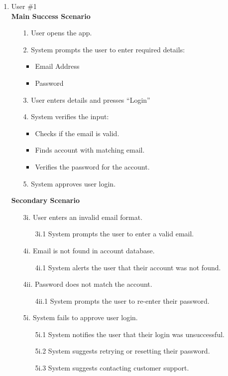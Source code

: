 \documentclass{article}
\begin{document}
\begin{enumerate}[{\bf BE1.}]
{\begin{enumerate}[{\bf VP1.}]
    \item User \#1 \\
	\textbf{Main Success Scenario}
	\begin{enumerate}
		\item[1.] User opens the app.
		\item[2.] System prompts the user to enter required details:
		\begin{itemize}
			\item Email Address
			\item Password
		\end{itemize}
		\item[3.] User enters details and presses “Login”
		\item[4.] System verifies the input:
		\begin{itemize}
			\item Checks if the email is valid.
			\item Finds account with matching email.
			\item Verifies the password for the account.
		\end{itemize}
		\item[5.] System approves user login.
		\end{enumerate}

	\textbf{Secondary Scenario}
	\begin{enumerate}
		\item[3i.] User enters an invalid email format.
		\begin{enumerate}
			\item[3i.1] System prompts the user to enter a valid email.
		\end{enumerate}
		\item[4i.] Email is not found in account database.
		\begin{enumerate}
			\item[4i.1] System alerts the user that their account was not found.
		\end{enumerate}
		\item[4ii.] Password does not match the account.
		\begin{enumerate}
			\item [4ii.1] System prompts the user to re-enter their password.
		\end{enumerate}
		\item [5i.] System fails to approve user login.
		\begin{enumerate}
			\item [5i.1] System notifies the user that their login was unsuccessful.
			\item [5i.2] System suggests retrying or resetting their password.
			\item [5i.3] System suggests contacting customer support.
		\end{enumerate}
	\end{enumerate}


\end{enumerate}}
\end{enumerate}
\end{document}
